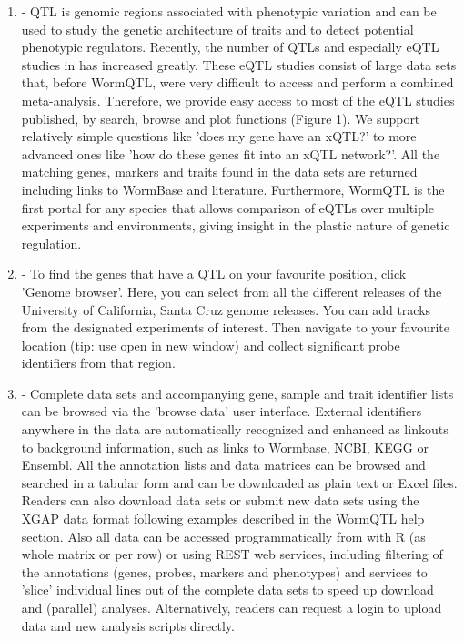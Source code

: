 \begin{enumerate}\itemsep1pt
\item {} - QTL is genomic regions associated with phenotypic variation and can be 
used to study the genetic architecture of traits and to detect potential phenotypic regulators. 
Recently, the number of QTLs and especially eQTL studies in  has increased greatly. 
These eQTL studies consist of large data sets that, before WormQTL, were very difficult to access 
and perform a combined meta-analysis. Therefore, we provide easy access to most of the eQTL studies 
published, by search, browse and plot functions (Figure 1). We support relatively simple questions like 
'does my gene have an xQTL?' to more advanced ones like 'how do these genes fit into an xQTL network?'. 
All the matching genes, markers and traits found in the data sets are returned including links to 
WormBase and literature. Furthermore, WormQTL is the first portal for any species that allows comparison 
of eQTLs over multiple experiments and environments, giving insight in the plastic nature of genetic 
regulation.
\item {} - To find the genes that have a QTL on your favourite position, click 
'Genome browser'. Here, you can select from all the different releases of the University of California, 
Santa Cruz genome releases. You can add tracks from the designated experiments of interest. Then 
navigate to your favourite location (tip: use open in new window) and collect significant probe 
identifiers from that region.
\item {} - Complete data sets and accompanying gene, sample and trait identifier 
lists can be browsed via the 'browse data' user interface. External identifiers anywhere in the 
data are automatically recognized and enhanced as linkouts to background information, such as links 
to Wormbase, NCBI, KEGG or Ensembl. All the annotation lists and data matrices can be browsed and 
searched in a tabular form and can be downloaded as plain text or Excel files. Readers can also 
download data sets or submit new data sets using the XGAP data format following examples described 
in the WormQTL help section. Also all data can be accessed programmatically from with R (as whole 
matrix or per row) or using REST web services, including filtering of the annotations (genes, probes, 
markers and phenotypes) and services to 'slice' individual lines out of the complete data sets to 
speed up download and (parallel) analyses. Alternatively, readers can request a login to upload 
data and new analysis scripts directly.
\end{enumerate}

